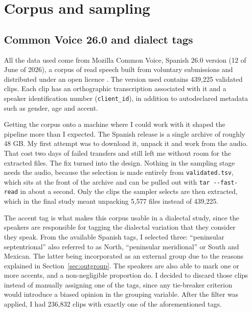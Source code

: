 \documentclass[11pt]{article}
\begin{document}
\section{Corpus and sampling}

\subsection{Common Voice 26.0 and dialect tags}

All the data used come from Mozilla Common Voice, Spanish 26.0 version (12 of
June of 2026), a corpus of read speech built from voluntary submissions and
distributed under an open licence \citep{ardila2020}. The version used contains
439,225 validated clips. Each clip has an orthographic transcription associated
with it and a speaker identification number (\texttt{client\_id}), in addition to
autodeclared metadata such as gender, age and accent.

Getting the corpus onto a machine where I could work with it shaped the pipeline
more than I expected. The Spanish release is a single archive of roughly 48 GB.
My first attempt was to download it, unpack it and work from the audio. That cost
two days of failed transfers and still left me without room for the extracted
files. The fix turned into the design. Nothing in the sampling stage needs the
audio, because the selection is made entirely from \texttt{validated.tsv}, which
sits at the front of the archive and can be pulled out with
\texttt{tar -{}-fast-read} in about a second. Only the clips the sampler selects
are then extracted, which in the final study meant unpacking 5,577 files instead
of 439,225.

The accent tag is what makes this corpus usable in a dialectal study, since the
speakers are responsible for tagging the dialectal variation that they consider
they speak. From the available Spanish tags, I selected three: ``peninsular
septentrional'' also referred to as North, ``peninsular meridional'' or South and
Mexican. The latter being incorporated as an external group due to the reasons
explained in Section~\ref{sec:outgroup}. The speakers are also able to mark one
or more accents, and a non-negligible proportion do. I decided to discard those
clips instead of manually assigning one of the tags, since any tie-breaker
criterion would introduce a biased opinion in the grouping variable. After the
filter was applied, I had 236,832 clips with exactly one of the aforementioned
tags.
\end{document}
